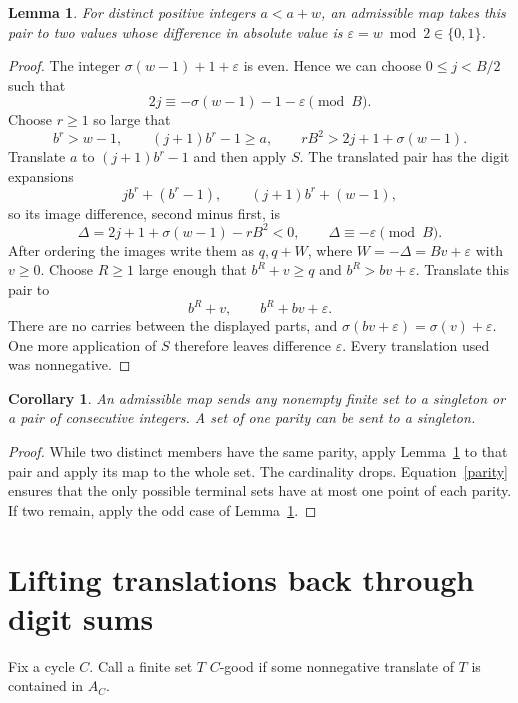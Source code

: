 \documentclass[11pt]{article}
\newtheorem{lemma}{Lemma}
\newtheorem{corollary}{Corollary}
\begin{document}
\begin{lemma}\label{pair}
For distinct positive integers $a<a+w$, an admissible map takes this
pair to two values whose difference in absolute value is
$\varepsilon=w\bmod2\in\{0,1\}$.
\end{lemma}
\begin{proof}
The integer $\sigma(w-1)+1+\varepsilon$ is even. Hence we can choose
$0\le j<B/2$ such that
\[
2j\equiv-\sigma(w-1)-1-\varepsilon\pmod B.
\]
Choose $r\ge1$ so large that
\[
b^r>w-1,\qquad (j+1)b^r-1\ge a,\qquad
rB^2>2j+1+\sigma(w-1).
\]
Translate $a$ to $(j+1)b^r-1$ and then apply $S$. The translated pair
has the digit expansions
\[
j b^r+(b^r-1),\qquad (j+1)b^r+(w-1),
\]
so its image difference, second minus first, is
\[
\Delta=2j+1+\sigma(w-1)-rB^2<0,
\qquad \Delta\equiv-\varepsilon\pmod B.
\]
After ordering the images write them as $q,q+W$, where
$W=-\Delta=Bv+\varepsilon$ with $v\ge0$. Choose $R\ge1$ large enough
that $b^R+v\ge q$ and $b^R>bv+\varepsilon$. Translate this pair to
\[
b^R+v,\qquad b^R+bv+\varepsilon.
\]
There are no carries between the displayed parts, and
$\sigma(bv+\varepsilon)=\sigma(v)+\varepsilon$.
One more application of $S$ therefore leaves difference $\varepsilon$.
Every translation used was nonnegative.
\end{proof}

\begin{corollary}\label{collapse}
An admissible map sends any nonempty finite set to a singleton or a
pair of consecutive integers. A set of one parity can be sent to a
singleton.
\end{corollary}
\begin{proof}
While two distinct members have the same parity, apply Lemma~\ref{pair}
to that pair and apply its map to the whole set. The cardinality drops.
Equation~\eqref{parity} ensures that the only possible terminal sets
have at most one point of each parity. If two remain, apply the odd
case of Lemma~\ref{pair}.
\end{proof}

\section*{Lifting translations back through digit sums}
Fix a cycle $C$. Call a finite set $T$ $C$-good if some nonnegative
translate of $T$ is contained in $A_C$.
\end{document}
